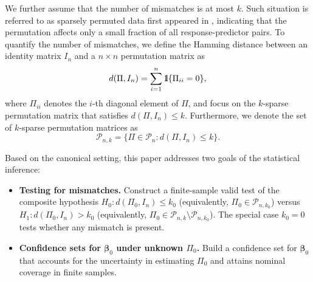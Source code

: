 \documentclass[11pt, reqno]{amsart}
\renewcommand{\le}{\leqslant}
\newcommand{\mP}{\mathcal{P}}
\newcommand{\1}{\mbox{1}\hspace{-0.25em}\mbox{l}}
\theoremstyle{definition}\newtheorem{problem}{Problem}[section]
\theoremstyle{definition}\newtheorem{definition}[problem]{Definition}
\theoremstyle{remark}\newtheorem{assumption}{Assumption}
\theoremstyle{remark}\newtheorem{remark}[problem]{Remark}
\theoremstyle{definition}\newtheorem{example}[problem]{Example}
\theoremstyle{plain}\newtheorem{theorem}[problem]{Theorem}
\theoremstyle{plain}\newtheorem{question}[problem]{Question}
\theoremstyle{plain}\newtheorem{lemma}[problem]{Lemma}
\theoremstyle{plain}\newtheorem{proposition}[problem]{Proposition}
\theoremstyle{plain}\newtheorem{corollary}[problem]{Corollary}
\theoremstyle{plain}\newtheorem{conjecture}[problem]{Conjecture}
\begin{document}
We further assume that the number of mismatches is at most $k$. Such situation is referred to as sparsely permuted data first appeared in \cite{slawski2019linear}, indicating that the permutation affects only a small fraction of all response-predictor pairs. 
To quantify the number of mismatches, 
we define the Hamming distance between an identity matrix $I_n$ and a $n \times n$ permutation matrix as 
\begin{equation}
d(\Pi, I_n) = \sum_{i = 1}^{n} \1\{\Pi_{ii} = 0\},
\end{equation}
where $\Pi_{ii}$ denotes the $i$-th diagonal element of $\Pi$, and focus on the $k$-sparse permutation matrix that satisfies $d(\Pi, I_n) \le k$. Furthermore, we denote the set of $k$-sparse permutation matrices as 
\begin{equation}
    \mP_{n,k}=\{\Pi\in\mP_n:d(\Pi,I_n)\le k\}.
\end{equation}


Based on the canonical setting, this paper addresses two goals of the statistical inference:
\begin{itemize}
\item[(G1)] \textbf{Testing for mismatches.}  
Construct a finite-sample valid test of the composite hypothesis $H_0: d(\Pi_0,I_n)\le k_0$ (equivalently, $\Pi_0\in\mP_{n,k_0}$) versus $H_1: d(\Pi_0,I_n)>k_0$ (equivalently, $\Pi_0\in\mP_{n,k}\setminus\mP_{n,k_0}$). The special case $k_0=0$ tests whether any mismatch is present.
\item[(G2)] \textbf{Confidence sets for $\bm{\beta}_0$ under unknown $\Pi_0$.}  
Build a confidence set for $\bm{\beta}_0$ that accounts for the uncertainty in estimating $\Pi_0$ and attains nominal coverage in finite samples.
\end{itemize}
\end{document}

